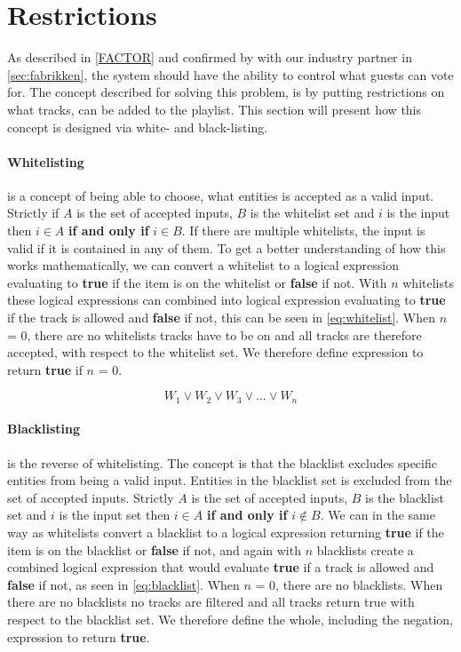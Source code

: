 \section{Restrictions}
\label{sec:restrictions}

As described in \cref{FACTOR} and confirmed by with our industry partner in \cref{sec:fabrikken}, the system should have the ability to control what guests can vote for. The concept described for solving this problem, is by putting restrictions on what tracks, can be added to the playlist. This section will present how this concept is designed via white- and black-listing.

\paragraph{Whitelisting} is a concept of being able to choose, what entities is accepted as a valid input. Strictly if $A$ is the set of accepted inputs, $B$ is the whitelist set and $i$ is the input then $i \in A$ \textbf{if and only if} $i \in B$. If there are multiple whitelists, the input is valid if it is contained in any of them.
To get a better understanding of how this works mathematically, we can convert a whitelist to a logical expression evaluating to \textbf{true} if the item is on the whitelist or \textbf{false} if not. With $n$ whitelists these logical expressions can combined into logical expression evaluating to \textbf{true} if the track is allowed and \textbf{false} if not, this can be seen in \cref{eq:whitelist}. When $n$ = $0$, there are no whitelists tracks have to be on and all tracks are therefore accepted, with respect to the whitelist set. We therefore define expression to return \textbf{true} if $n$ = $0$.

\begin{equation}
\label{eq:whitelist}
	W_1 \vee W_2 \vee W_3 \vee \dots \vee W_n
\end{equation}

\paragraph{Blacklisting} is the reverse of whitelisting. The concept is that the blacklist excludes specific entities from being a valid input. Entities in the blacklist set is excluded from the set of accepted inputs. Strictly $A$ is the set of accepted inputs, $B$ is the blacklist set and $i$ is the input set then $i \in A$ \textbf{if and only if} $i \notin B$.
We can in the same way as whitelists convert a blacklist to a logical expression returning \textbf{true} if the item is on the blacklist or \textbf{false} if not, and again with $n$ blacklists create a combined logical expression that would evaluate \textbf{true} if a track is allowed and \textbf{false} if not, as seen in \cref{eq:blacklist}. When $n$ = $0$, there are no blacklists. When there are no blacklists no tracks are filtered and all tracks return true with respect to the blacklist set. We therefore define the whole, including the negation, expression to return \textbf{true}.

